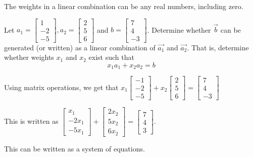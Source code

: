 \documentclass[../linalg.tex]{subfiles}
\begin{document}
The weights in a linear combination can be any real numbers, including zero.

\begin{example}
    Let $a_1=\begin{bmatrix}
        1\\-2\\-5
    \end{bmatrix}, a_2=\begin{bmatrix}
        2\\5\\6
    \end{bmatrix}$ and $b=\begin{bmatrix}
        7\\4\\-3
    \end{bmatrix}$. Determine whether $\vec{b}$ can be generated (or written) as a linear combination of $\vec{a_1}$ and $\vec{a_2}$. That is, determine whether weights $x_1$ and $x_2$ exist such that 
    \[ x_1a_1 + x_2a_2 = b \]

    Using matrix operations, we get that $x_1\begin{bmatrix}
        -1\\-2\\-5
    \end{bmatrix}+x_2\begin{bmatrix}
        2\\5\\6
    \end{bmatrix}=\begin{bmatrix}
        7\\4\\-3
    \end{bmatrix}$

    This is written as $\begin{bmatrix}
        x_1\\-2x_1\\-5x_1
    \end{bmatrix}+\begin{bmatrix}
        2x_2\\5x_2\\6x_2
    \end{bmatrix}=\begin{bmatrix}
        7\\4\\3
    \end{bmatrix}$.

    This can be written as a system of equations.


\end{example}
\end{document}
